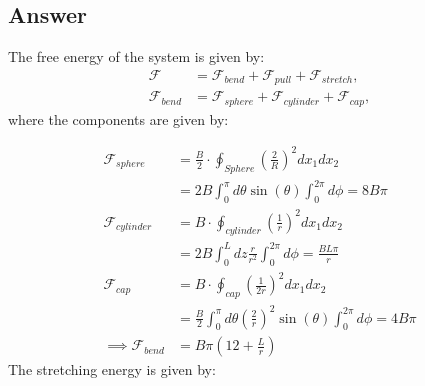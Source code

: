 \documentclass[a4paper]{article}
\begin{document}
\subsection*{Answer}
The free energy of the system is given by:
\begin{align*}
    \mathcal{F} &= \mathcal{F}_{bend} + \mathcal{F}_{pull} + \mathcal{F}_{stretch},\\
    \mathcal{F}_{bend} &= \mathcal{F}_{sphere} + \mathcal{F}_{cylinder} + \mathcal{F}_{cap},
\end{align*}where the components are given by:
\begin{comment}
\begin{align*}
    \mathcal{F}_{sphere} &= B\cdot\oint_{Sphere} \left(\frac{1}{R} - \frac{1}{L}\right)^2dx_1dx_2\\
    &= \frac{4\pi B}{2}\left(\frac{1}{R} - \frac{1}{L}\right)^2,\\
    \mathcal{F}_{cylinder} &= B\cdot\oint_{cylinder} \left(\frac{1}{R} - \frac{1}{L}\right)^2dx_1dx_2\\
    &=\frac{2\pi B}{L}\left(\frac{1}{R} - \frac{1}{L}\right)^2,\\
    \mathcal{F}_{cap} &= B\cdot\oint_{cap} \left(\frac{1}{R} - \frac{1}{L}\right)^2dx_1dx_2\\
    &=\frac{2\pi B}{R}\left(\frac{1}{R} - \frac{1}{L}\right)^2\\
    \implies \mathcal{F}_{bend} &= \frac{4\pi B}{2}\left(\frac{1}{R} - \frac{1}{L}\right)^2+\frac{2\pi B}{L}\left(\frac{1}{R} - \frac{1}{L}\right)^2 + \frac{2\pi B}{R}\left(\frac{1}{R} - \frac{1}{L}\right)^2
\end{align*}
\end{comment}
\begin{align*}
    \mathcal{F}_{sphere} &= \frac{B}{2}\cdot\oint_{Sphere} \left(\frac{2}{R} \right)^2dx_1dx_2\\
    &= 2B\int_0^{\pi} d\theta\sin(\theta) \int_0^{2\pi} d\phi = 8B\pi\\
    \mathcal{F}_{cylinder} &= B\cdot\oint_{cylinder} \left(\frac{1}{r}\right)^2dx_1dx_2\\
    &= 2B\int_0^Ldz \frac{r}{r^2}\int_0^{2\pi}d\phi = \frac{BL\pi}{r}\\
    \mathcal{F}_{cap} &= B\cdot\oint_{cap} \left(\frac{1}{2r}\right)^2dx_1dx_2\\
    &= \frac{B}{2}\int_0^\pi d\theta \left(\frac{2}{r}\right)^2 \sin(\theta)\int_0^{2\pi}d\phi = 4B\pi\\
    \implies \mathcal{F}_{bend} &= B\pi\left(12 + \frac{L}{r}\right)
\end{align*}The stretching energy is given by:
\end{document}
